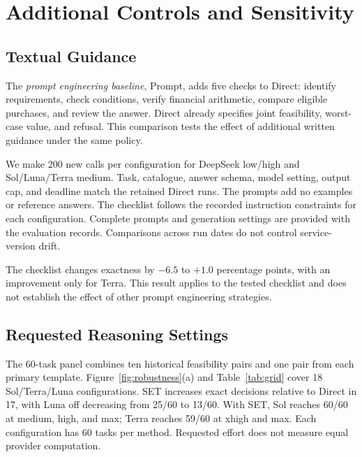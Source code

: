 \section{Additional Controls and Sensitivity}
\label{app:execution}
\subsection{Textual Guidance}
\label{app:prompt-controls}
The \emph{prompt engineering baseline}, Prompt, adds five checks to Direct: identify requirements, check conditions, verify financial arithmetic, compare eligible purchases, and review the answer. Direct already specifies joint feasibility, worst-case value, and refusal. This comparison tests the effect of additional written guidance under the same policy.

We make 200 new calls per configuration for DeepSeek low/high and Sol/Luna/Terra medium. Task, catalogue, answer schema, model setting, output cap, and deadline match the retained Direct runs. The prompts add no examples or reference answers. The checklist follows the recorded instruction constraints for each configuration. Complete prompts and generation settings are provided with the evaluation records. Comparisons across run dates do not control service-version drift.

\begin{table}[!tbp]
\centering\small\setlength{\tabcolsep}{6pt}

\caption{\textbf{Textual guidance and fixed decision processing.} Direct, Prompt, and SET are exact-decision percentages on the same 200 tasks per configuration. SET uses the primary results in Table~\ref{tab:main}. Prompt U/R/O gives unsafe acceptance, false refusal, and other errors; $\Delta$ is Prompt minus Direct in percentage points (pp). All outcomes remain in their denominators.}
\label{tab:prompt-control}
\end{table}

The checklist changes exactness by $-6.5$ to $+1.0$ percentage points, with an improvement only for Terra. This result applies to the tested checklist and does not establish the effect of other prompt engineering strategies.

\subsection{Requested Reasoning Settings}
\label{app:grid}
The 60-task panel combines ten historical feasibility pairs and one pair from each primary template. Figure~\ref{fig:robustness}(a) and Table~\ref{tab:grid} cover 18 Sol/Terra/Luna configurations. SET increases exact decisions relative to Direct in 17, with Luna off decreasing from 25/60 to 13/60. With SET, Sol reaches 60/60 at medium, high, and max; Terra reaches 59/60 at xhigh and max. Each configuration has 60 tasks per method. Requested effort does not measure equal provider computation.

